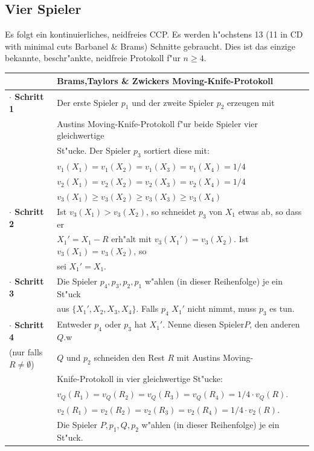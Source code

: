 \documentclass[11pt, a4paper, twoside]{article}
\newcommand{\wf}{\color{white}}
\newcommand{\tf}{\color{black}}
\numberwithin{equation}{section}
\begin{document}
\subsection{Vier Spieler}
Es folgt ein kontinuierliches, neidfreies CCP. Es werden h"ochstens 13 (11 in\cite{16} CD with minimal cuts Barbanel $\&$ Brams) Schnitte gebraucht. Dies ist das einzige bekannte, beschr"ankte, neidfreie Protokoll f"ur $n \geq 4$.\\ 
\newline
\begin{tabular}{|ll|}
\hline
&\textbf{Brams,Taylors \& Zwickers Moving-Knife-Protokoll}\\
\hline
\textbf{$\cdot$ Schritt 1}&Der erste Spieler $p_1$ und der zweite Spieler $p_2$ erzeugen mit\\&Austins Moving-Knife-Protokoll f"ur beide Spieler vier gleichwertige\\&St"ucke. Der Spieler $p_3$ sortiert diese mit:\\
& $v_1(X_1)=v_1(X_2)=v_1(X_3)=v_1(X_4)=1/4$\\
& $v_2(X_1)=v_2(X_2)=v_2(X_3)=v_2(X_4)=1/4$\\
& $v_3(X_1)\geq  v_3(X_2)\geq v_3(X_3)\geq v_3(X_4)$\\
\textbf{$\cdot$ Schritt 2}& Ist $v_3(X_1)>v_3(X_2)$, so schneidet $p_3$ von $X_1$ etwas ab, so dass er\\&$X_1'=X_1-R$ erh"alt mit $v_3(X_1')=v_3(X_2)$. Ist $v_3(X_1)=v_3(X_2)$, so\\&sei  $X_1'=X_1$.\\
\textbf{$\cdot$ Schritt 3}&Die Spieler $p_4,p_3,p_2,p_1$ w"ahlen (in dieser Reihenfolge) je ein St"uck\\&aus $\{X_1',X_2,X_3,X_4\}$. Falls $p_4$ $X_1'$ nicht nimmt, muss $p_3$ es tun.\\
\textbf{$\cdot$ Schritt 4}& Entweder $p_4$ oder $p_3$ hat $X_1'$. Nenne diesen Spieler$P$, den anderen $Q$.\wf w\tf\\(nur falls $R \neq \emptyset$)&$Q$  und  $p_2$ schneiden den Rest $R$ mit Austins Moving-\\&Knife-Protokoll in vier gleichwertige St"ucke:\\
& $v_Q(R_1)=v_Q(R_2)=v_Q(R_3)=v_Q(R_4)=1/4 \cdot v_Q(R).$\\& $v_2(R_1)=v_2(R_2)=v_2(R_3)=v_2(R_4)=1/4 \cdot v_2(R).$\\&Die Spieler $P,p_1,Q,p_2$ w"ahlen (in dieser Reihenfolge) je ein St"uck.\\
\hline
\end{tabular}
\end{document}
